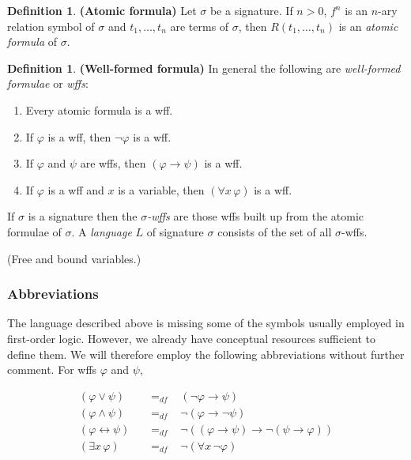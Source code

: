\documentclass[10pt, a4paper, oneside]{article}
\theoremstyle{definition}
\newtheorem{dfn}[thm]{Definition}
\theoremstyle{remark}
\theoremstyle{plain}
\newcommand{\defspace}[1]{\hspace{#1} &=_{df} \hspace{#1}}
\begin{document}
\begin{dfn}
    \textbf{(Atomic formula)}
    Let $\sigma$ be a signature. If $n > 0$, $f^n$ is an $n$-ary relation symbol
    of $\sigma$ and $t_1, \dotsc, t_n$ are terms of $\sigma$, then
    $R(t_1, \dotsc, t_n)$ is an \emph{atomic formula} of $\sigma$.
\end{dfn}

\begin{dfn}
    \textbf{(Well-formed formula)}
    In general the following are \emph{well-formed formulae} or \emph{wffs}:
    
    \begin{enumerate}
        \item Every atomic formula is a wff.
        \item If $\varphi$ is a wff, then $\neg\varphi$ is a wff.
        \item If $\varphi$ and $\psi$ are wffs, then $(\varphi \rightarrow
            \psi)$ is a wff.
        \item If $\varphi$ is a wff and $x$ is a variable, then $(\forall{x} \,
            \varphi)$ is a wff.
    \end{enumerate}
    
    If $\sigma$ is a signature then the \emph{$\sigma$-wffs} are those wffs
    built up from the atomic formulae of $\sigma$. A \emph{language} $L$ of
    signature $\sigma$ consists of the set of all $\sigma$-wffs.
\end{dfn}

(Free and bound variables.)

\subsubsection{Abbreviations}

The language described above is missing some of the symbols usually employed in
first-order logic. However, we already have conceptual resources sufficient to
define them. We will therefore employ the following abbreviations without
further comment. For wffs $\varphi$ and $\psi$,

\begin{align*}
    (\varphi \vee \psi) \defspace{10pt} (\neg \varphi \rightarrow \psi) \\
    (\varphi \wedge \psi) \defspace{10pt} \neg (\varphi \rightarrow \neg\psi) \\
    (\varphi \leftrightarrow \psi) \defspace{10pt}
        \neg (
            (\varphi \rightarrow \psi)
            \rightarrow
            \neg (\psi \rightarrow \varphi)
        ) \\
    (\exists{x} \, \varphi) \defspace{10pt} \neg (\forall{x} \, \neg\varphi)
\end{align*}
\end{document}
